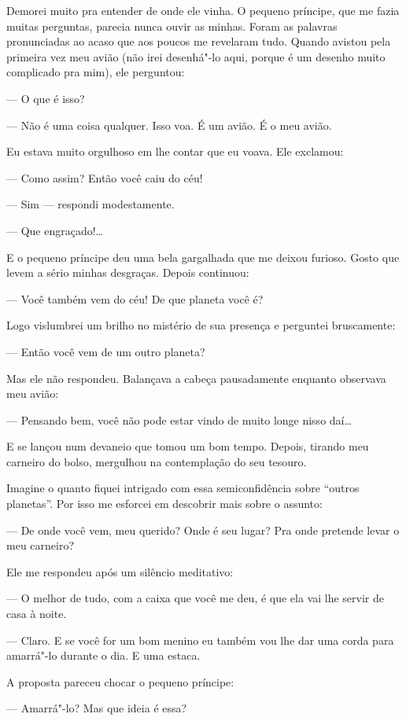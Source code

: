 \begin{Parallel}[p]{}{}
{Demorei muito pra entender de onde ele vinha. O pequeno príncipe, que me
fazia muitas perguntas, parecia nunca ouvir as minhas. Foram as palavras
pronunciadas ao acaso que aos poucos me revelaram tudo. Quando avistou
pela primeira vez meu avião (não irei desenhá"-lo aqui, porque é um
desenho muito complicado pra mim), ele perguntou:

--- O que é isso?

--- Não é uma coisa qualquer. Isso voa. É um avião. É o meu avião.

Eu estava muito orgulhoso em lhe contar que eu voava. Ele exclamou:

--- Como assim? Então você caiu do céu!

--- Sim --- respondi modestamente.

--- Que engraçado!\ldots{}

E o pequeno príncipe deu uma bela gargalhada que me deixou furioso.
Gosto que levem a sério minhas desgraças. Depois continuou:

--- Você também vem do céu! De que planeta você é?

Logo vislumbrei um brilho no mistério de sua presença e perguntei
bruscamente:

--- Então você vem de um outro planeta?

Mas ele não respondeu. Balançava a cabeça pausadamente enquanto
observava meu avião:

--- Pensando bem, você não pode estar vindo de muito longe nisso daí\ldots{}

E se lançou num devaneio que tomou um bom tempo. Depois, tirando meu
carneiro do bolso, mergulhou na contemplação do seu tesouro.

Imagine o quanto fiquei intrigado com essa semiconfidência sobre
``outros planetas''. Por isso me esforcei em descobrir mais sobre o
assunto:

--- De onde você vem, meu querido? Onde é seu lugar? Pra onde pretende
levar o meu carneiro?

Ele me respondeu após um silêncio meditativo:

--- O melhor de tudo, com a caixa que você me deu, é que ela vai lhe
servir de casa à noite.

--- Claro. E se você for um bom menino eu também vou lhe dar uma corda
para amarrá"-lo durante o dia. E uma estaca.

A proposta pareceu chocar o pequeno príncipe:

--- Amarrá"-lo? Mas que ideia é essa?

}
\end{Parallel}
